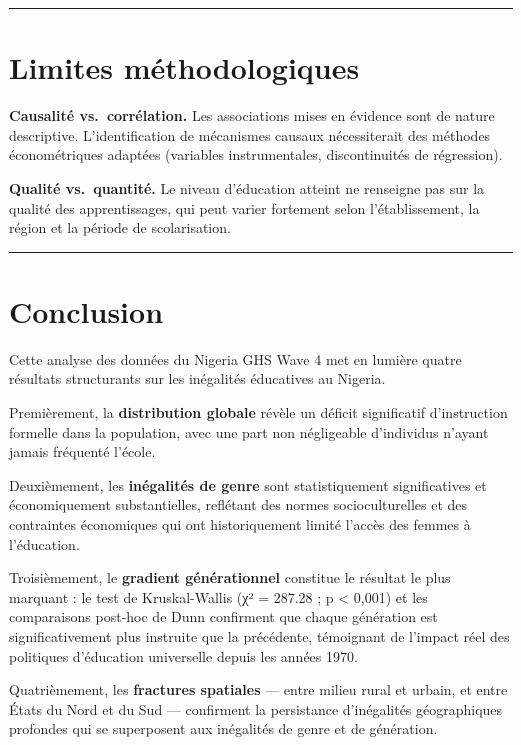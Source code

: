 \documentclass[
]{article}
\begin{document}
\begin{center}\rule{0.5\linewidth}{0.5pt}\end{center}

\section{Limites méthodologiques}\label{limites-muxe9thodologiques}

\textbf{Causalité vs.~corrélation.} Les associations mises en évidence
sont de nature descriptive. L'identification de mécanismes causaux
nécessiterait des méthodes économétriques adaptées (variables
instrumentales, discontinuités de régression).

\textbf{Qualité vs.~quantité.} Le niveau d'éducation atteint ne
renseigne pas sur la qualité des apprentissages, qui peut varier
fortement selon l'établissement, la région et la période de
scolarisation.

\begin{center}\rule{0.5\linewidth}{0.5pt}\end{center}

\section{Conclusion}\label{conclusion}

Cette analyse des données du Nigeria GHS Wave 4 met en lumière quatre
résultats structurants sur les inégalités éducatives au Nigeria.

Premièrement, la \textbf{distribution globale} révèle un déficit
significatif d'instruction formelle dans la population, avec une part
non négligeable d'individus n'ayant jamais fréquenté l'école.

Deuxièmement, les \textbf{inégalités de genre} sont statistiquement
significatives et économiquement substantielles, reflétant des normes
socioculturelles et des contraintes économiques qui ont historiquement
limité l'accès des femmes à l'éducation.

Troisièmement, le \textbf{gradient générationnel} constitue le résultat
le plus marquant : le test de Kruskal-Wallis (χ² = 287.28 ; p
\textless{} 0,001) et les comparaisons post-hoc de Dunn confirment que
chaque génération est significativement plus instruite que la
précédente, témoignant de l'impact réel des politiques d'éducation
universelle depuis les années 1970.

Quatrièmement, les \textbf{fractures spatiales} --- entre milieu rural
et urbain, et entre États du Nord et du Sud --- confirment la
persistance d'inégalités géographiques profondes qui se superposent aux
inégalités de genre et de génération.
\end{document}
